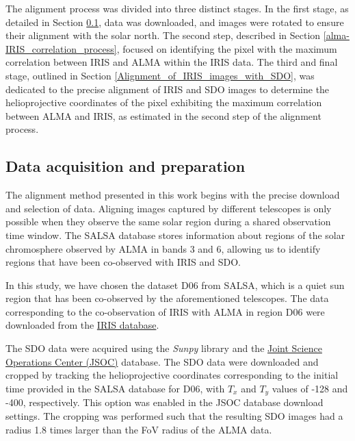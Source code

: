 \documentclass[a4paper,alpha-refs]{eSpectra}
\begin{document}
The alignment process was divided into three distinct stages. In the first stage,  as detailed in Section \ref{data_preparation}, data was downloaded, and images were rotated to ensure their alignment with the solar north. 
The second step, described in Section \ref{alma-IRIS_correlation_process}, focused on identifying the pixel with the maximum correlation between IRIS and ALMA within the IRIS data. The third and final stage, outlined in Section \ref{Alignment_of_IRIS_images_with_SDO}, was dedicated to the precise alignment of IRIS and SDO images to determine the helioprojective coordinates of the pixel exhibiting the maximum correlation between ALMA and IRIS, as estimated in the second step of the alignment process.


\subsection{Data acquisition and  preparation}
\label{data_preparation}

The alignment method presented in this work begins with the precise download and selection of data. Aligning images captured by different telescopes is only possible when they observe the same solar region during a shared observation time window. The SALSA database stores information about regions of the solar chromosphere observed by ALMA in bands 3 and 6, allowing us to identify regions that have been co-observed with IRIS and SDO.

In this study, we have chosen the dataset D06 from SALSA, which is a quiet sun region that has been co-observed by the aforementioned telescopes. The data corresponding to the co-observation of IRIS with ALMA in region D06 were downloaded from the \href{https://iris.lmsal.com/search/}{IRIS database}. 

The SDO data were acquired using the \textit{Sunpy} library and the \href{http://jsoc.stanford.edu/}{Joint Science Operations Center (JSOC)} database.  
The SDO data were downloaded and cropped by tracking the helioprojective coordinates corresponding to the initial time provided in the SALSA database for D06, with $T_x$ and $T_y$ values of -128 and -400, respectively. This option was enabled in the JSOC database download settings. The cropping was performed such that the resulting SDO images had a radius 1.8 times larger than the FoV radius of the ALMA data.
\end{document}
